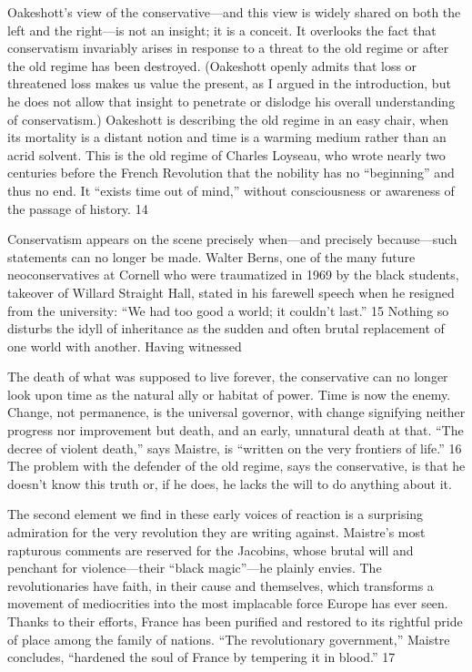  \par 
Oakeshott’s view of the conservative—and this view is widely shared on both the left and the right—is not an insight; it is a conceit. It overlooks the fact that conservatism invariably arises in response to a threat to the old regime or after the old regime has been destroyed. (Oakeshott openly admits that loss or threatened loss makes us value the present, as I argued in the introduction, but he does not allow that insight to penetrate or dislodge his overall understanding of conservatism.) Oakeshott is describing the old regime in an easy chair, when its mortality is a distant notion and time is a warming medium rather than an acrid solvent. This is the old regime of Charles Loyseau, who wrote nearly two centuries before the French Revolution that the nobility has no “beginning” and thus no end. It “exists time out of mind,” without consciousness or awareness of the passage of history. 14
 \par 
Conservatism appears on the scene precisely when—and precisely because—such statements can no longer be made. Walter Berns, one of the many future neoconservatives at Cornell who were traumatized in 1969 by the black students, takeover of Willard Straight Hall, stated in his farewell speech when he resigned from the university: “We had too good a world; it couldn’t last.” 15 Nothing so disturbs the idyll of inheritance as the sudden and often brutal replacement of one world with another. Having witnessed
 \par 
The death of what was supposed to live forever, the conservative can no longer look upon time as the natural ally or habitat of power. Time is now the enemy. Change, not permanence, is the universal governor, with change signifying neither progress nor improvement but death, and an early, unnatural death at that. “The decree of violent death,” says Maistre, is “written on the very frontiers of life.” 16 The problem with the defender of the old regime, says the conservative, is that he doesn’t know this truth or, if he does, he lacks the will to do anything about it.
 \par 
The second element we find in these early voices of reaction is a surprising admiration for the very revolution they are writing against. Maistre’s most rapturous comments are reserved for the Jacobins, whose brutal will and penchant for violence—their “black magic”—he plainly envies. The revolutionaries have faith, in their cause and themselves, which transforms a movement of mediocrities into the most implacable force Europe has ever seen. Thanks to their efforts, France has been purified and restored to its rightful pride of place among the family of nations. “The revolutionary government,” Maistre concludes, “hardened the soul of France by tempering it in blood.” 17
